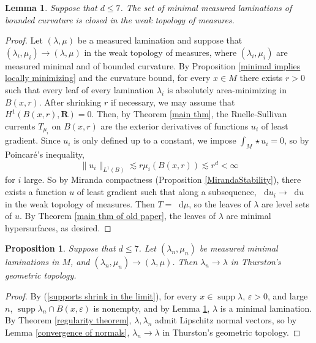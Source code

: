 \documentclass[reqno,11pt]{amsart}
\newcommand{\RR}{\mathbf{R}}
\newcommand*\dif{\mathop{}\!\mathrm{d}}
\DeclareMathOperator{\supp}{supp}
\newtheorem{lemma}[theorem]{Lemma}
\newtheorem{proposition}[theorem]{Proposition}
\theoremstyle{definition}
\numberwithin{equation}{section}
\begin{document}
\begin{lemma}\label{limits of measured geodesic lams are geodesic}
Suppose that $d \leq 7$. The set of minimal measured laminations of bounded curvature is closed in the weak topology of measures.
\end{lemma}
\begin{proof}
Let $(\lambda, \mu)$ be a measured lamination and suppose that $(\lambda_i, \mu_i) \to (\lambda, \mu)$ in the weak topology of measures, where $(\lambda_i, \mu_i)$ are measured minimal and of bounded curvature.
By Proposition \ref{minimal implies locally minimizing} and the curvature bound, for every $x \in M$ there exists $r > 0$ such that every leaf of every lamination $\lambda_i$ is absolutely area-minimizing in $B(x, r)$.
After shrinking $r$ if necessary, we may assume that $H^1(B(x, r), \RR) = 0$.
Then, by Theorem \ref{main thm}, the Ruelle-Sullivan currents $T_{\mu_i}$ on $B(x, r)$ are the exterior derivatives of functions $u_i$ of least gradient.
Since $u_i$ is only defined up to a constant, we impose $\int_M \star u_i = 0$, so by Poincar\'e's inequality,
$$\|u_i\|_{L^1(B)} \lesssim r\mu_i(B(x, r)) \lesssim r^d < \infty$$
for $i$ large.
So by Miranda compactness (Proposition \ref{MirandaStability}), there exists a function $u$ of least gradient such that along a subsequence, $\dif u_i \to \dif u$ in the weak topology of measures.
Then $T = \dif \mu$, so the leaves of $\lambda$ are level sets of $u$.
By Theorem \ref{main thm of old paper}, the leaves of $\lambda$ are minimal hypersurfaces, as desired.
\end{proof}

\begin{proposition}
Suppose that $d \leq 7$.
Let $(\lambda_n, \mu_n)$ be measured minimal laminations in $M$, and $(\lambda_n, \mu_n) \to (\lambda, \mu)$.
Then $\lambda_n \to \lambda$ in Thurston's geometric topology.
\end{proposition}
\begin{proof}
By (\ref{supports shrink in the limit}), for every $x \in \supp \lambda$, $\varepsilon > 0$, and large $n$, $\supp \lambda_n \cap B(x, \varepsilon)$ is nonempty, and by Lemma \ref{limits of measured geodesic lams are geodesic}, $\lambda$ is a minimal lamination.
By Theorem \ref{regularity theorem}, $\lambda, \lambda_n$ admit Lipschitz normal vectors, so by Lemma \ref{convergence of normals}, $\lambda_n \to \lambda$ in Thurston's geometric topology.
\end{proof}
\end{document}
